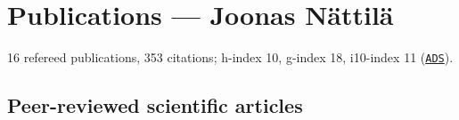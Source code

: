 \documentclass[10pt]{article}
\newcommand\VRule{\color{lightgray}\vrule width 0.5pt}
\begin{document}


\newpage

\section*{Publications --- Joonas N\"attil\"a}
16 refereed publications, 353 citations; h-index 10, g-index 18, i10-index 11 (\href{http://adsabs.harvard.edu/cgi-bin/abs_connect?author=nattila,+J.&aut_syn=YES&return_req=no_params}{\nolinkurl{ADS}}).

\subsection*{\phantom{sub} Peer-reviewed scientific articles}

\vspace{-20pt}
\renewcommand\refname{\phantom{bla}}



\nocite{*}


\end{document}
